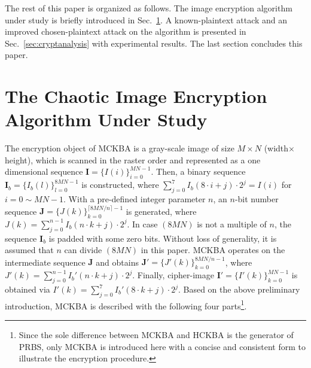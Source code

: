 \documentclass{ws-ijbc}
\begin{document}
The rest of this paper is organized as follows. The image encryption algorithm under study is briefly
introduced in Sec.~\ref{sec:scheme}. A known-plaintext attack and an improved chosen-plaintext attack on the algorithm is presented in
Sec.~\ref{sec:cryptanalysis} with experimental results. The last section concludes this paper.

\section{The Chaotic Image Encryption Algorithm Under Study}
\label{sec:scheme}

The encryption object of MCKBA is a gray-scale image of size $M\times
N$ (width$\times$height), which is scanned in the raster order and represented as a one dimensional sequence
$\bm{I}=\{I(i)\}_{i=0}^{MN-1}$. Then, a binary sequence $\bm{I}_b=\{I_b(l)\}_{l=0}^{8MN-1}$ is constructed,
where $\sum_{j=0}^7I_b(8\cdot i+j)\cdot 2^j=I(i)$ for $i=0\sim MN-1$. With a pre-defined integer parameter $n$, an $n$-bit number sequence $\bm{J}=\{J(k)\}_{k=0}^{\lceil 8MN/n\rceil-1}$ is generated, where $J(k)=\sum_{j=0}^{n-1}I_b(n\cdot k+j)\cdot 2^j$. In case $(8MN)$ is not a multiple of $n$,
the sequence $\bm{I}_b$ is padded with some zero bits. Without loss of generality, it is assumed that $n$ can divide $(8MN)$ in this paper. MCKBA operates on the intermediate sequence $\bm{J}$ and obtains
$\bm{J}'=\{J'(k)\}_{k=0}^{8MN/n-1}$, where $J'(k)=\sum_{j=0}^{n-1}I_b'(n\cdot k+j)\cdot 2^j$. Finally, cipher-image
$\bm{I}'=\{I'(k)\}_{k=0}^{MN-1}$ is obtained via $I'(k)=\sum_{j=0}^7I_b'(8\cdot k+j)\cdot 2^j$. Based on the above preliminary introduction, MCKBA is described
with the following four parts\footnote{Since the sole difference between MCKBA and HCKBA is the generator of PRBS, only MCKBA is introduced here
with a concise and consistent form to illustrate the encryption procedure.}.
\end{document}
